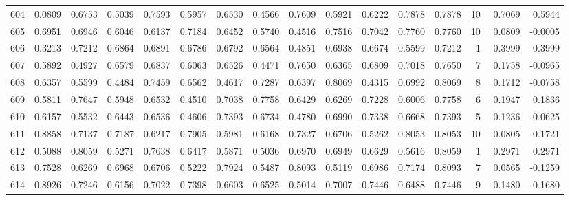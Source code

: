 \begin{tabular}{lrrrrrrrrrrrrrrr}
604 &      0.0809 &  0.6753 &  0.5039 &  0.7593 &  0.5957 &  0.6530 &  0.4566 &  0.7609 &  0.5921 &  0.6222 &   0.7878 &     0.7878 &     10 &                    0.7069 &                     0.5944 \\
605 &      0.6951 &  0.6946 &  0.6046 &  0.6137 &  0.7184 &  0.6452 &  0.5740 &  0.4516 &  0.7516 &  0.7042 &   0.7760 &     0.7760 &     10 &                    0.0809 &                    -0.0005 \\
606 &      0.3213 &  0.7212 &  0.6864 &  0.6891 &  0.6786 &  0.6792 &  0.6564 &  0.4851 &  0.6938 &  0.6674 &   0.5599 &     0.7212 &      1 &                    0.3999 &                     0.3999 \\
607 &      0.5892 &  0.4927 &  0.6579 &  0.6837 &  0.6063 &  0.6526 &  0.4471 &  0.7650 &  0.6365 &  0.6809 &   0.7018 &     0.7650 &      7 &                    0.1758 &                    -0.0965 \\
608 &      0.6357 &  0.5599 &  0.4484 &  0.7459 &  0.6562 &  0.4617 &  0.7287 &  0.6397 &  0.8069 &  0.4315 &   0.6992 &     0.8069 &      8 &                    0.1712 &                    -0.0758 \\
609 &      0.5811 &  0.7647 &  0.5948 &  0.6532 &  0.4510 &  0.7038 &  0.7758 &  0.6429 &  0.6269 &  0.7228 &   0.6006 &     0.7758 &      6 &                    0.1947 &                     0.1836 \\
610 &      0.6157 &  0.5532 &  0.6443 &  0.6536 &  0.4606 &  0.7393 &  0.6734 &  0.4780 &  0.6990 &  0.7338 &   0.6668 &     0.7393 &      5 &                    0.1236 &                    -0.0625 \\
611 &      0.8858 &  0.7137 &  0.7187 &  0.6217 &  0.7905 &  0.5981 &  0.6168 &  0.7327 &  0.6706 &  0.5262 &   0.8053 &     0.8053 &     10 &                   -0.0805 &                    -0.1721 \\
612 &      0.5088 &  0.8059 &  0.5271 &  0.7638 &  0.6417 &  0.5871 &  0.5036 &  0.6970 &  0.6949 &  0.6629 &   0.5616 &     0.8059 &      1 &                    0.2971 &                     0.2971 \\
613 &      0.7528 &  0.6269 &  0.6968 &  0.6706 &  0.5222 &  0.7924 &  0.5487 &  0.8093 &  0.5119 &  0.6986 &   0.7174 &     0.8093 &      7 &                    0.0565 &                    -0.1259 \\
614 &      0.8926 &  0.7246 &  0.6156 &  0.7022 &  0.7398 &  0.6603 &  0.6525 &  0.5014 &  0.7007 &  0.7446 &   0.6488 &     0.7446 &      9 &                   -0.1480 &                    -0.1680 \\

\end{tabular}

